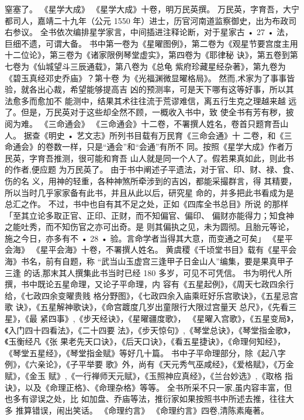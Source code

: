 窒塞了。
《星学大成》
《星学大成》十卷，明万民英撰。
万民英，字育吾，大宁都司人，嘉靖二十九年（公元 1550
年）进士，历官河南道监察御史，出为布政司右参议。
全书依次编排星学家言，中间插进注释论断，对于星家古
• 27 •
法，巨细不遗，可谓大备。
书中第一卷为《星曜图例》，第二卷为《观星节要宫度主用
十二位论》，第三卷为《诸家限例琴堂虚实》，第四卷为《耶律秘
诀》，第五卷到第七卷为《仙城望斗三辰通载》，第八卷为《总龟
紫府珍藏星经杂著》，第九卷为《碧玉真经邓史乔庙》？第十卷
为《光福渊微显曜格局》。
然而,术家为了事事皆验，就各出心裁，希望能够提高吉
凶的预测率，可是天下哪有这等好事，所以其法愈多而愈加不
能测中，结果其术往往流于荒谬难信，离五行生克之理越来越
远了。但是，万民英对于这些却全然不顾，一概收入书中，致
使全书有芳有秽，披阅为难。
《三命通会》
《三命通会》十二卷，不署撰人姓名，卷首只题育吾山人。
据查《明史 • 艺文志》所列书目载有万民育《三命会通》十
二卷，和《三命通会》的卷数一样，只是“通会”和“会通”有所不
同。按照《星学大成》作者万民英，字育吾推测，很可能和育吾
山人就是同一个人了。假若果真如此，则此书的作者,便应题
为万民英了。
由于书中阐述子平遗法，对于官、印、财、禄、食、伤的名
义，用神的轻重，各种神煞所牵涉到的吉凶，都能采撮群言，得
其精要，所以当时几乎家家备有此书，并且从此以后，研究星
命的，并多把此书看成为是总汇之作。
不过，书中也自有其不足之处，正如《四库全书总目》所说
的那样「至其立论多取正官、正印、正财，而不知偏官、偏印、
偏财亦能得力；知食神之能吐秀，而不知伤官之亦可出奇。是
则其偏执之见，未为圆彻。且胎元等论，施之今日，亦多有不
• 28 •
验。言命学者当得其大意，而变通之可矣」
《星平会海》
《星平会海》十卷，不署撰人姓名。
黄虞稷《千顷堂书目》载有《星平会海》书名，前有自题，称
“武当山玉虚宫三逢甲子日金山人”编集，要是果真甲子三逢
的话,那末其人撰集此书当时已经 180 多岁，可见不可凭信。
书为明代人所撰，书中既论五星命理，又论子平命理，内
容有《五星起例》，《周天七政四余行给，《七政四余变曜贵贱
格分野图》，《七政四余入庙乘旺好乐宫歌诀》，《五星忌宫歌
诀》，《五星解神歌诀》，《命宫踱度几岁出童限行大限过宫量天
总尺》，《先看三星》，《最 紧四事》,《步天经诀》，《星曜疆度歌》，
《星曜入宫歌》，《五星变局》，《入门四十四看法》，《二十四要
法》，《步天惊句》,《琴堂总诀》，《琴堂指金歌》，《玉衡经凡《张
果老先天口诀》，《后天口诀》，《看五星捷诀》，《命理何知经》，
《琴堂五星经》，《琴堂指金赋》等好几十篇。
书中子平命理部分，除《起八字例》，《六亲论》，《子平举要
歌》外，尚有《天元秀气巫咸经》，《爱格赋》，《万金赋》，《金玉
赋》,《一行禅师天元赋》，《玉照神应真经》，《兰台妙选》,《取格
指诀》，以及《命理正格》、《命理杂格》等等。
全书所采不只一家,虽内容丰富，但也多有谬误之处，比
如加盘、乔庙等法，推衍家如果按照书中所述去推，往往大多
推算错误，闹出笑话。
《命理约言》
《命理约言》四卷,清陈素庵著。
